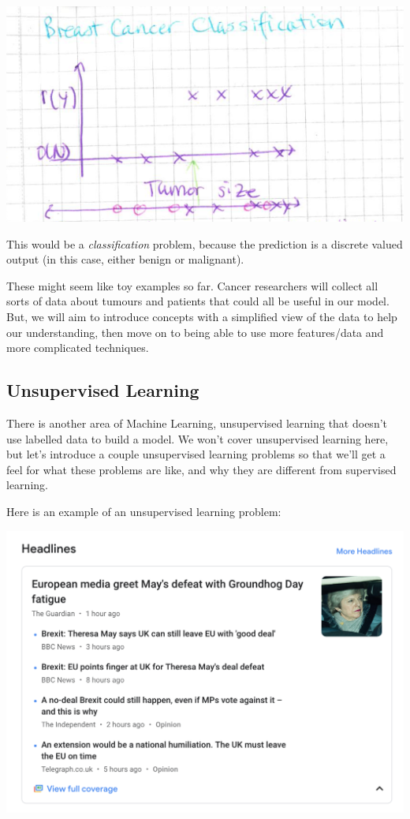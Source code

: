 \documentclass[12pt]{article}
\begin{document}
\includegraphics[width={\textwidth}]{tumour-size}

This would be a \textit{classification} problem, because the prediction is a discrete valued output (in this case, either benign or malignant). 

These might seem like toy examples so far. Cancer researchers will collect all sorts of data about tumours and patients that could all be useful in our model. But, we will aim to introduce concepts with a simplified view of the data to help our understanding, then move on to being able to use more features/data and more complicated techniques.

\subsection{Unsupervised Learning}

There is another area of Machine Learning, unsupervised learning that doesn't use labelled data to build a model. We won't cover unsupervised learning here, but let's introduce a couple unsupervised learning problems so that we'll get a feel for what these problems are like, and why they are different from supervised learning.

Here is an example of an unsupervised learning problem:

\includegraphics[width={\textwidth}]{google-news}
\end{document}
